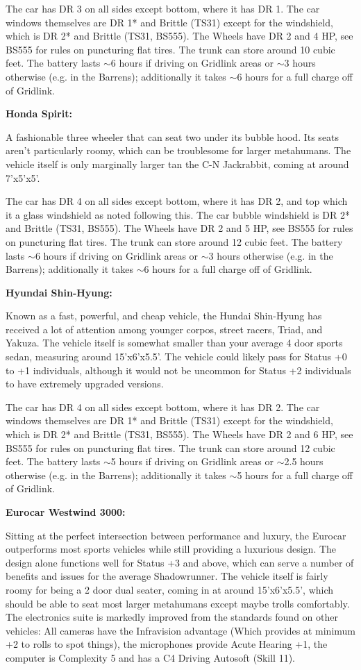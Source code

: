  The car has DR 3 on all sides except bottom, where it has DR 1. The car windows themselves are DR 1* and Brittle (TS31) except for the windshield, which is DR 2* and Brittle (TS31, BS555). The Wheels have DR 2 and 4 HP, see BS555 for rules on puncturing flat tires. The trunk can store around 10 cubic feet. The battery lasts $\sim$6 hours if driving on Gridlink areas or $\sim$3 hours otherwise (e.g. in the Barrens); additionally it takes $\sim$6 hours for a full charge off of Gridlink.
 
 \textbf{Honda Spirit:}
 
 A fashionable three wheeler that can seat two under its bubble hood. Its seats aren't particularly roomy, which can be troublesome for larger metahumans. The vehicle itself is only marginally larger tan the C-N Jackrabbit, coming at around 7'x5'x5'.
 
 The car has DR 4 on all sides except bottom, where it has DR 2, and top which it a glass windshield as noted following this. The car bubble windshield is DR 2* and Brittle (TS31, BS555). The Wheels have DR 2 and 5 HP, see BS555 for rules on puncturing flat tires. The trunk can store around 12 cubic feet. The battery lasts $\sim$6 hours if driving on Gridlink areas or $\sim$3 hours otherwise (e.g. in the Barrens); additionally it takes $\sim$6 hours for a full charge off of Gridlink.

\textbf{Hyundai Shin-Hyung:}

Known as a fast, powerful, and cheap vehicle, the Hundai Shin-Hyung has received a lot of attention among younger corpos, street racers, Triad, and Yakuza. The vehicle itself is somewhat smaller than your average 4 door sports sedan, measuring around 15'x6'x5.5'. The vehicle could likely pass for Status +0 to +1 individuals, although it would not be uncommon for Status +2 individuals to have extremely upgraded versions.

The car has DR 4 on all sides except bottom, where it has DR 2. The car windows themselves are DR 1* and Brittle (TS31) except for the windshield, which is DR 2* and Brittle (TS31, BS555). The Wheels have DR 2 and 6 HP, see BS555 for rules on puncturing flat tires. The trunk can store around 12 cubic feet. The battery lasts $\sim$5 hours if driving on Gridlink areas or $\sim$2.5 hours otherwise (e.g. in the Barrens); additionally it takes $\sim$5 hours for a full charge off of Gridlink.

\textbf{Eurocar Westwind 3000:}

Sitting at the perfect intersection between performance and luxury, the Eurocar outperforms most sports vehicles while still providing a luxurious design. The design alone functions well for Status +3 and above, which can serve a number of benefits and issues for the average Shadowrunner. The vehicle itself is fairly roomy for being a 2 door dual seater, coming in at around 15'x6'x5.5', which should be able to seat most larger metahumans except maybe trolls comfortably. The electronics suite is markedly improved from the standards found on other vehicles: All cameras have the Infravision advantage (Which provides at minimum +2 to rolls to spot things), the microphones provide Acute Hearing +1, the computer is Complexity 5 and has a C4 Driving Autosoft (Skill 11).

